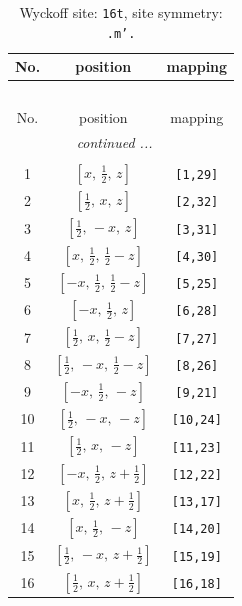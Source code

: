 \documentclass[fleqn,8pt]{jsarticle}
\begin{document}
\renewcommand{\arraystretch}{1.2}
\begin{longtable}{ccc}
\caption{Wyckoff site: {\tt 16t}, site symmetry: {\tt .m'.}}
 \\
 \hline \hline
No. & position & mapping \\ \hline \endfirsthead

\multicolumn{2}{l}{\tablename\ \thetable{}} \\
 \hline \hline
No. & position & mapping \\ \hline \endhead

 \hline \hline
\multicolumn{2}{r}{\footnotesize\it continued ...} \\ \endfoot

 \hline \hline
\multicolumn{2}{r}{} \\ \endlastfoot

1 & $\left[ x,\, \frac{1}{2},\, z \right]$ & {\tt [1,29]} \\ \hline
2 & $\left[ \frac{1}{2},\, x,\, z \right]$ & {\tt [2,32]} \\ \hline
3 & $\left[ \frac{1}{2},\, - x,\, z \right]$ & {\tt [3,31]} \\ \hline
4 & $\left[ x,\, \frac{1}{2},\, \frac{1}{2} - z \right]$ & {\tt [4,30]} \\ \hline
5 & $\left[ - x,\, \frac{1}{2},\, \frac{1}{2} - z \right]$ & {\tt [5,25]} \\ \hline
6 & $\left[ - x,\, \frac{1}{2},\, z \right]$ & {\tt [6,28]} \\ \hline
7 & $\left[ \frac{1}{2},\, x,\, \frac{1}{2} - z \right]$ & {\tt [7,27]} \\ \hline
8 & $\left[ \frac{1}{2},\, - x,\, \frac{1}{2} - z \right]$ & {\tt [8,26]} \\ \hline
9 & $\left[ - x,\, \frac{1}{2},\, - z \right]$ & {\tt [9,21]} \\ \hline
10 & $\left[ \frac{1}{2},\, - x,\, - z \right]$ & {\tt [10,24]} \\ \hline
11 & $\left[ \frac{1}{2},\, x,\, - z \right]$ & {\tt [11,23]} \\ \hline
12 & $\left[ - x,\, \frac{1}{2},\, z + \frac{1}{2} \right]$ & {\tt [12,22]} \\ \hline
13 & $\left[ x,\, \frac{1}{2},\, z + \frac{1}{2} \right]$ & {\tt [13,17]} \\ \hline
14 & $\left[ x,\, \frac{1}{2},\, - z \right]$ & {\tt [14,20]} \\ \hline
15 & $\left[ \frac{1}{2},\, - x,\, z + \frac{1}{2} \right]$ & {\tt [15,19]} \\ \hline
16 & $\left[ \frac{1}{2},\, x,\, z + \frac{1}{2} \right]$ & {\tt [16,18]} \\
\end{longtable}
\end{document}
